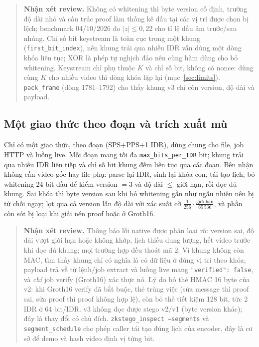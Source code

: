 \documentclass[10pt,a4paper]{article}
\newcommand{\srccpp}[3]{}
\newcommand{\review}[1]{\begin{quote}\colorbox{ReviewBg}{\parbox{0.94\linewidth}{\textbf{Nhận xét review.} #1}}\end{quote}}
\begin{document}
\srccpp{native/src/cavlc_stream.cpp}{1740}{1792}

\review{Không có whitening thì byte version cố định, trường độ dài nhỏ và cấu trúc proof làm thống kê dấu tại các vị trí được chọn bị lệch; benchmark 04/10/2026 đo $|z|\leq 0{,}22$ cho tỉ lệ dấu âm trước/sau nhúng. Chỉ số bit keystream là toàn cục trong một khung (\texttt{first\_bit\_index}), nên khung trải qua nhiều IDR vẫn dùng một dòng khóa liên tục; XOR là phép tự nghịch đảo nên cùng hàm dùng cho bỏ whitening. Keystream chỉ phụ thuộc $K$ và chỉ số bit, không có nonce: dùng cùng $K$ cho nhiều video thì dòng khóa lặp lại (mục~\ref{sec:limits}). \texttt{pack\_frame} (dòng 1781--1792) cho thấy khung v3 chỉ còn version, độ dài và payload.}

\subsection{Một giao thức theo đoạn và trích xuất mù}

Chỉ có một giao thức, theo đoạn (SPS+PPS+1 IDR), dùng chung cho file, job HTTP và luồng live. Mỗi đoạn mang tối đa \texttt{max\_bits\_per\_IDR} bit; khung trải qua nhiều IDR liên tiếp và chỉ số bit khung đếm liên tục qua các đoạn. Bên nhận không cần video gốc hay file phụ: parse lại IDR, sinh lại khóa con, tái tạo lịch, bỏ whitening 24 bit đầu để kiểm version $=3$ và độ dài $\leq$ giới hạn, rồi đọc đủ khung. Sai khóa thì byte version sau khi bỏ whitening gần như ngẫu nhiên nên bị từ chối ngay; lọt qua cả version lẫn độ dài với xác suất cỡ $\frac{1}{256}\cdot\frac{\text{giới hạn}}{65\,536}$, và phần còn sót bị loại khi giải nén proof hoặc ở Groth16.

\review{Thông báo lỗi native được phân loại rõ: version sai, độ dài vượt giới hạn hoặc không khớp, lịch thiếu dung lượng, hết video trước khi đọc đủ khung; mọi trường hợp đều thoát mã 2. Vì khung không còn MAC, tìm thấy khung chỉ có nghĩa là có dữ liệu ở đúng vị trí theo khóa; payload trả về từ lệnh/job extract và luồng live mang \texttt{"verified": false}, và \emph{chỉ} job verify (Groth16) xác thực nó. Lý do bỏ thẻ HMAC 16 byte của v2: khi Groth16 verify đã bắt buộc, thẻ trùng việc (sửa message thì proof sai, sửa proof thì proof không hợp lệ), còn bỏ thẻ tiết kiệm 128 bit, tức 2 IDR ở 64 bit/IDR. v3 không đọc được stego v2/v1 (byte version khác); đây là thay đổi có chủ đích. \texttt{zkstego\_inspect --segments} và \texttt{segment\_schedule} cho phép caller tái tạo đúng lịch của encoder, đây là cơ sở để demo và hash video định vị từng bit.}
\end{document}
